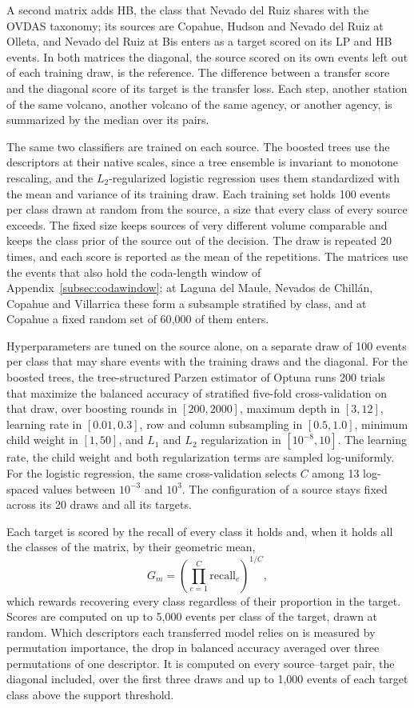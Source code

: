 \documentclass[pdflatex,sn-mathphys-num]{sn-jnl}
\begin{document}
A second matrix adds HB, the class that Nevado del
Ruiz shares with the OVDAS taxonomy; its sources are Copahue, Hudson and
Nevado del Ruiz at Olleta, and Nevado del Ruiz at Bis enters as a target
scored on its LP and HB events. In both matrices the diagonal, the source scored on its own events left
out of each training draw, is the reference. The difference between a
transfer score and the diagonal score of its target is the transfer loss. Each step, another station of the same volcano,
another volcano of the same agency, or another agency, is summarized by the
median over its pairs.

The same two classifiers are trained on each source. The boosted trees use
the descriptors at their native scales, since a tree ensemble is invariant to
monotone rescaling, and the $L_2$-regularized
logistic regression uses them standardized with the mean and variance of its
training draw. Each training set holds 100 events per class drawn at random from the
source, a size that every class of every source exceeds. The fixed size
keeps sources of very different volume comparable and keeps the class prior
of the source out of the decision. The draw is repeated 20 times, and each
score is reported as the mean of the repetitions. The matrices use the
events that also hold the coda-length window of
Appendix~\ref{subsec:codawindow}; at Laguna del Maule, Nevados de
Chill\'an, Copahue and Villarrica these form a subsample stratified by
class, and at Copahue a fixed random set of 60{,}000 of them enters.

Hyperparameters are tuned on the source alone, on a separate draw of 100
events per class that may share events with the training draws and the
diagonal. For the boosted trees, the tree-structured
Parzen estimator of Optuna \cite{akiba_optuna_2019} runs 200 trials that maximize the
balanced accuracy of stratified five-fold cross-validation on that draw, over
boosting rounds in $[200, 2000]$, maximum depth in $[3, 12]$, learning rate
in $[0.01, 0.3]$, row and column subsampling in $[0.5, 1.0]$, minimum child
weight in $[1, 50]$, and $L_1$ and $L_2$ regularization in $[10^{-8}, 10]$.
The learning rate, the child weight and both regularization terms are
sampled log-uniformly. For the logistic regression, the same cross-validation
selects $C$ among 13 log-spaced values between $10^{-3}$ and $10^{3}$. The
configuration of a source stays fixed across its 20 draws and all its
targets.

Each target is scored by the recall of every class it holds and, when it
holds all the classes of the matrix, by their geometric mean,
\begin{equation}
G_m = \left( \prod_{c=1}^{C} \mathrm{recall}_c \right)^{1/C},
\end{equation}
which rewards recovering every class regardless of their proportion in the
target. Scores are computed on up to 5{,}000 events per class of the target,
drawn at random. Which descriptors each transferred model relies on is measured by
permutation importance, the drop in balanced accuracy averaged over three
permutations of one descriptor. It is computed on every source--target
pair, the diagonal included, over the first three draws and up to 1{,}000
events of each target class above the support threshold.
\end{document}
